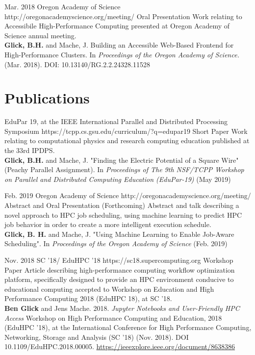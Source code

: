 \documentclass[10pt]{article} %
\begin{document}
\award
{Mar. 2018}
{ }
{Oregon Academy of Science}
{http://oregonacademyscience.org/meeting/}
{Oral Presentation}
{Work relating to Accessibile High-Performance Computing presented at Oregon Academy of Science annual meeting.\\ \textbf{Glick, B.H.} and Mache, J. Building an Accessible Web-Based Frontend for High-Performance Clusters. In \textit{Proceedings of the Oregon Academy of Science.} (Mar. 2018). DOI: 10.13140/RG.2.2.24328.11528}


\section{Publications}

{}
{EduPar 19, at the IEEE International Parallel and Distributed Processing Symposium }
{https://tcpp.cs.gsu.edu/curriculum/?q=edupar19}
{Short Paper}
{Work relating to computational physics and research computing education published at the 33rd IPDPS. \\ 
	\textbf{Glick, B.H.} and Mache, J. "Finding the Electric Potential of a Square Wire" (Peachy Parallel Assignment). In \textit{Proceedings of The 9th NSF/TCPP Workshop on Parallel and Distributed Computing Education (EduPar-19)} (May 2019) }

\award
{Feb. 2019}
{}
{Oregon Academy of Science }
{http://oregonacademyscience.org/meeting/}
{Abstract and Oral Presentation (Forthcoming)}
{Abstract and talk describing a novel approach to HPC job scheduling, using machine learning to predict HPC job behavior in order to create a more intelligent execution schedule.\\ \textbf{Glick, B. H.} and Mache, J. "Using Machine Learning to Enable Job-Aware Scheduling". In \textit{Proceedings of the Oregon Academy of Science} (Feb. 2019)}


\award
{Nov. 2018}
{}
{SC '18/ EduHPC '18}
{https://sc18.supercomputing.org}
{Workshop Paper}
{Article describing high-performance computing workflow optimization platform, specifically designed to provide an HPC environment conducive to educational computing accepted to Workshop on Education and High Performance Computing 2018 (EduHPC 18), at SC '18. \\ \textbf{Ben Glick} and Jens Mache. 2018. \textit{Jupyter Notebooks and User-Friendly HPC Access} Workshop on High Performance Computing and Education, 2018 (EduHPC '18), at the International Conference for High Performance Computing, Networking, Storage and Analysis (SC '18)   (Nov. 2018). DOI 10.1109/EduHPC.2018.00005. \href{https://ieeexplore.ieee.org/document/8638386}{https://ieeexplore.ieee.org/document/8638386}}
\end{document}
